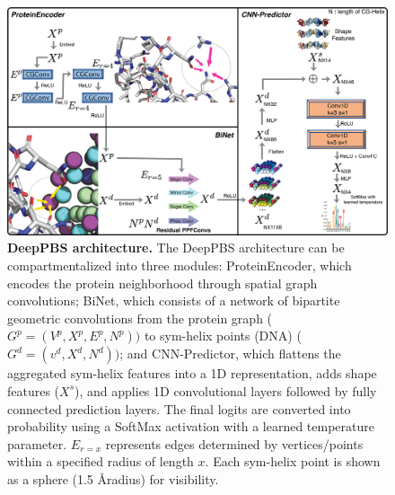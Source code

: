 \begin{center}
\begin{figure}[H]
  \includegraphics[width=\linewidth]{./pdnafigs/figS3.png}
    \caption[DeepPBS architecture.]{\textbf{DeepPBS architecture.} The DeepPBS architecture can be compartmentalized into three modules: ProteinEncoder,
which encodes the protein neighborhood through spatial graph convolutions; BiNet, which consists of a network of
bipartite geometric convolutions from the protein graph ($G^p =
(V^p, X^p, E^p, N^p))$ to sym-helix points (DNA) ($G^d = (v^d, X^d, N^d))$; and CNN-Predictor, which flattens the aggregated sym-helix features into a 1D representation, adds shape features ($X^s$),
and applies 1D convolutional layers followed by fully connected prediction layers. The final logits are converted into probability using a SoftMax activation with a learned temperature parameter. $E_{r=x}$ represents edges determined by vertices/points within a specified radius of length $x$. Each sym-helix point is shown as a sphere (1.5 \AA radius) for visibility.}
  \label{fig:pdnaS3}
\end{figure}
\end{center}

